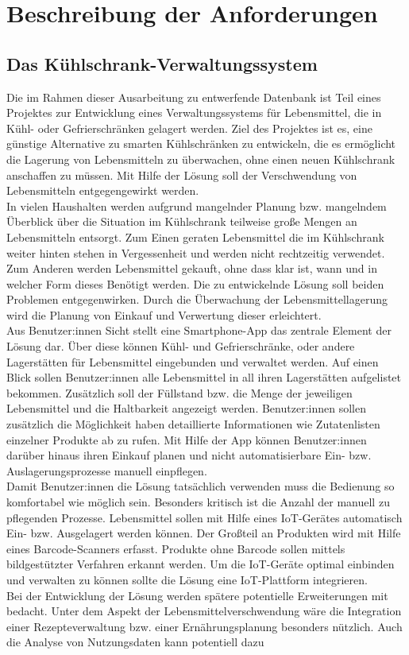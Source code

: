\chapter{Beschreibung der Anforderungen}\label{ch:Beschreibung der Anforderungen}
\section{Das Kühlschrank-Verwaltungssystem}\label{sec:Das Kühlschrank-Verwaltungssystem}

Die im Rahmen dieser Ausarbeitung zu entwerfende Datenbank ist Teil eines Projektes zur Entwicklung eines Verwaltungssystems für Lebensmittel, die in Kühl- oder Gefrierschränken gelagert werden. Ziel des Projektes ist es, eine günstige Alternative zu smarten Kühlschränken zu entwickeln, die es ermöglicht die Lagerung von Lebensmitteln zu überwachen, ohne einen neuen Kühlschrank anschaffen zu müssen. Mit Hilfe der Lösung soll der Verschwendung von Lebensmitteln entgegengewirkt werden.\\ In vielen Haushalten werden aufgrund mangelnder Planung bzw. mangelndem Überblick über die Situation im Kühlschrank teilweise große Mengen an Lebensmitteln entsorgt. Zum Einen geraten Lebensmittel die im Kühlschrank weiter hinten stehen in Vergessenheit und werden nicht rechtzeitig verwendet. Zum Anderen werden Lebensmittel gekauft, ohne dass klar ist, wann und in welcher Form dieses Benötigt werden. Die zu entwickelnde Lösung soll beiden Problemen entgegenwirken. Durch die Überwachung der Lebensmittellagerung wird die Planung von Einkauf und Verwertung dieser erleichtert.\\ Aus Benutzer:innen Sicht stellt eine Smartphone-App das zentrale Element der Lösung dar. Über diese können Kühl- und Gefrierschränke, oder andere Lagerstätten für Lebensmittel eingebunden und verwaltet werden. Auf einen Blick sollen Benutzer:innen alle Lebensmittel in all ihren Lagerstätten aufgelistet bekommen. Zusätzlich soll der Füllstand bzw. die Menge der jeweiligen Lebensmittel und die Haltbarkeit angezeigt werden. Benutzer:innen sollen zusätzlich die Möglichkeit haben detaillierte Informationen wie Zutatenlisten einzelner Produkte ab zu rufen. Mit Hilfe der App können Benutzer:innen darüber hinaus ihren Einkauf planen und nicht automatisierbare Ein- bzw. Auslagerungsprozesse manuell einpflegen.\\ Damit Benutzer:innen die Lösung tatsächlich verwenden muss die Bedienung so komfortabel wie möglich sein. Besonders kritisch ist die Anzahl der manuell zu pflegenden Prozesse. Lebensmittel sollen mit Hilfe eines IoT-Gerätes automatisch Ein- bzw. Ausgelagert werden können. Der Großteil an Produkten wird mit Hilfe eines Barcode-Scanners erfasst. Produkte ohne Barcode sollen mittels bildgestützter Verfahren erkannt werden. Um die IoT-Geräte optimal einbinden und verwalten zu können sollte die Lösung eine IoT-Plattform integrieren.\\ Bei der Entwicklung der Lösung werden spätere potentielle Erweiterungen mit bedacht. Unter dem Aspekt der Lebensmittelverschwendung wäre die Integration einer Rezepteverwaltung bzw. einer Ernährungsplanung besonders nützlich. Auch die Analyse von Nutzungsdaten kann potentiell dazu 